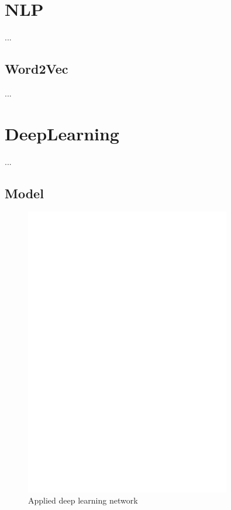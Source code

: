 \documentclass[11pt,a4paper]{article}
\begin{document}
\section{NLP}

...


\subsection{Word2Vec}

...%


\section{DeepLearning}

...


\subsection{Model}
\begin{figure}
	\centering
	\includegraphics[trim={0cm 19.5cm 0cm 3cm},clip,page=2, width=0.8\textwidth]{img/model}
	\caption{Applied deep learning network}
	\label{fig:model}
\end{figure}
\end{document}
